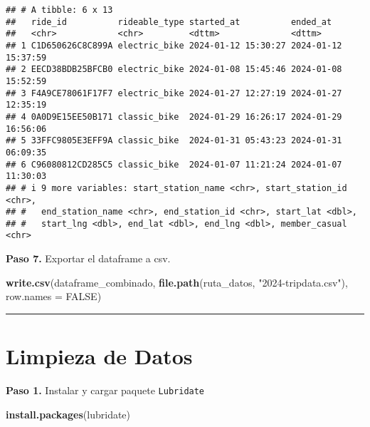 \documentclass[
]{article}
\newenvironment{Shaded}{\begin{snugshade}}{\end{snugshade}}
\newcommand{\AttributeTok}[1]{\textcolor[rgb]{0.13,0.29,0.53}{#1}}
\newcommand{\ConstantTok}[1]{\textcolor[rgb]{0.56,0.35,0.01}{#1}}
\newcommand{\FunctionTok}[1]{\textcolor[rgb]{0.13,0.29,0.53}{\textbf{#1}}}
\newcommand{\NormalTok}[1]{#1}
\newcommand{\StringTok}[1]{\textcolor[rgb]{0.31,0.60,0.02}{#1}}
\begin{document}
\begin{verbatim}
## # A tibble: 6 x 13
##   ride_id          rideable_type started_at          ended_at           
##   <chr>            <chr>         <dttm>              <dttm>             
## 1 C1D650626C8C899A electric_bike 2024-01-12 15:30:27 2024-01-12 15:37:59
## 2 EECD38BDB25BFCB0 electric_bike 2024-01-08 15:45:46 2024-01-08 15:52:59
## 3 F4A9CE78061F17F7 electric_bike 2024-01-27 12:27:19 2024-01-27 12:35:19
## 4 0A0D9E15EE50B171 classic_bike  2024-01-29 16:26:17 2024-01-29 16:56:06
## 5 33FFC9805E3EFF9A classic_bike  2024-01-31 05:43:23 2024-01-31 06:09:35
## 6 C96080812CD285C5 classic_bike  2024-01-07 11:21:24 2024-01-07 11:30:03
## # i 9 more variables: start_station_name <chr>, start_station_id <chr>,
## #   end_station_name <chr>, end_station_id <chr>, start_lat <dbl>,
## #   start_lng <dbl>, end_lat <dbl>, end_lng <dbl>, member_casual <chr>
\end{verbatim}

\hfill\break
\textbf{Paso 7.} Exportar el dataframe a csv.

\begin{Shaded}
\begin{Highlighting}[]
\FunctionTok{write.csv}\NormalTok{(dataframe\_combinado, }\FunctionTok{file.path}\NormalTok{(ruta\_datos, }\StringTok{"2024{-}tripdata.csv"}\NormalTok{), }\AttributeTok{row.names =} \ConstantTok{FALSE}\NormalTok{)}
\end{Highlighting}
\end{Shaded}

\hfill\break

\begin{center}\rule{0.5\linewidth}{0.5pt}\end{center}

\hfill\break

\section{Limpieza de Datos}\label{sec-limpieza-de-datos}

\hfill\break
\textbf{Paso 1.} Instalar y cargar paquete \texttt{Lubridate}

\begin{Shaded}
\begin{Highlighting}[]
\FunctionTok{install.packages}\NormalTok{(}\StringTok{\textquotesingle{}lubridate\textquotesingle{}}\NormalTok{)}
\end{Highlighting}
\end{Shaded}
\end{document}
